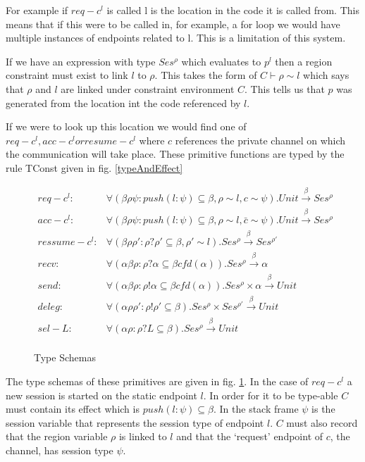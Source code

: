 For example if $req-c^l$ is called l is the location in the code it is called from. This means that if this were to be called in, for example, a for loop we would have multiple instances of endpoints related to l. This is a limitation of this system. 

If we have an expression with type $Ses^\rho$ which evaluates to $p^l$ then a region constraint must exist to link $l$ to $\rho$. This takes the form of $C\vdash \rho  \sim l$ which says that $\rho$ and $l$ are linked under constraint environment $C$. This tells us that $p$ was generated from the location int the code referenced by $l$.

If we were to look up this location we would find one of $req-c^l, acc-c^l or resume-c^l$ where $c$ references the private channel on which the communication will take place. These primitive functions are typed by the rule TConst given in fig. \ref{typeAndEffect}

\begin{figure}
\begin{align*}
 req-c^l : & \forall(\beta \rho \psi:push(l:\psi) \subseteq \beta, \rho \sim l, c \sim \psi).Unit  \overset{\beta}{\rightarrow} Ses^\rho\\ 
 acc-c^l : & \forall(\beta \rho \psi:push(l:\psi) \subseteq \beta, \rho \sim l, \bar{c} \sim \psi).Unit  \overset{\beta}{\rightarrow} Ses^\rho \\
 ressume-c^l :&  \forall(\beta \rho \rho':\rho ? \rho' \subseteq \beta, \rho' \sim l).Ses^{\rho}  \overset{\beta}{\rightarrow} Ses^{\rho'} \\
 recv : &\forall(\alpha \beta \rho : \rho ? \alpha \subseteq \beta cfd(\alpha)).Ses^{\rho} \overset{\beta}{\rightarrow} \alpha \\
 send : &\forall(\alpha \beta \rho : \rho ! \alpha \subseteq \beta cfd(\alpha)).Ses^{\rho} \times \alpha \overset{\beta}{\rightarrow} Unit \\
 deleg :& \forall(\alpha \rho \rho' : \rho ! \rho' \subseteq \beta ).Ses^{\rho} \times Ses^{\rho'} \overset{\beta}{\rightarrow} Unit \\
 sel-L :& \forall(\alpha \rho : \rho ? L \subseteq \beta ).Ses^{\rho}  \overset{\beta}{\rightarrow} Unit \\
\end{align*}
\caption{Type Schemas}
\label{ts}
\end{figure}

The type schemas of these primitives are given in fig. \ref{ts}. In the case of $req-c^l$ a new session is started on the static endpoint $l$. In order for it to be type-able $C$ must contain its effect which is $push(l:\psi) \subseteq \beta$. In the stack frame $\psi$ is the session variable that represents the session type of endpoint $l$. $C$ must also record that the region variable $\rho$ is linked to $l$ and that the `request' endpoint of $c$, the channel, has session type $\psi$. 

